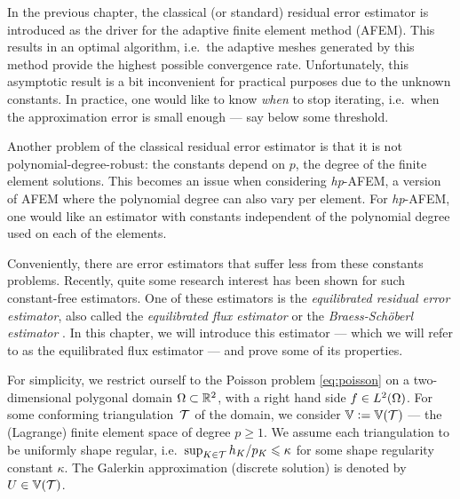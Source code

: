\documentclass[thesis.tex]{subfiles}
\begin{document}
In the previous chapter, the classical (or standard) residual error estimator is introduced as the driver for the
adaptive finite element method (AFEM). This results in an optimal algorithm, i.e.~the adaptive meshes
generated by this method provide the highest possible convergence rate. Unfortunately, this asymptotic result
is a bit inconvenient for practical purposes due to the unknown constants. In practice,
one would like to know \emph{when} to stop iterating, i.e.~when the approximation error is small enough --- say
below some threshold. 

Another problem of the classical residual error estimator is that it is not polynomial-degree-robust: 
the constants depend on $p$, the degree of the finite element solutions. This becomes an issue
when considering \emph{hp}-AFEM, a version of AFEM where the polynomial degree can also vary
per element. For \emph{hp}-AFEM, one would like an estimator with constants independent of the polynomial degree
used on each of the elements.

Conveniently, there are error estimators that suffer less from these constants problems. Recently, quite
some research interest has been shown for such constant-free estimators. One of these estimators is the
\emph{equilibrated residual error estimator}, also called the \emph{equilibrated flux estimator} or the \emph{Braess-Sch\"oberl estimator}
\cite{braessequil, braessequilrobust,ernequil}.
In this chapter, we will introduce this estimator --- which we will refer to as the equilibrated flux estimator --- and prove some
of its properties. 

For simplicity, we restrict ourself to the Poisson problem \eqref{eq:poisson} on a two-dimensional polygonal domain $\Omega \subset \mathbb{R}^2$,
with a right hand side $f \in L^2(\Omega)$. For some conforming triangulation~$\mathcal{T}$ of the domain,  we consider $\mathbb{V} := \mathbb{V}(\mathcal{T})$ --- the (Lagrange) finite
element space of degree $p\geq 1$. We assume each triangulation to be uniformly shape regular, i.e.~$\sup_{K \in \mathcal{T}} h_K/p_K \leqslant \kappa$ for
some shape regularity constant $\kappa$.
The Galerkin approximation (discrete solution) is denoted by $U \in \mathbb{V}(\mathcal{T})$.
\end{document}

